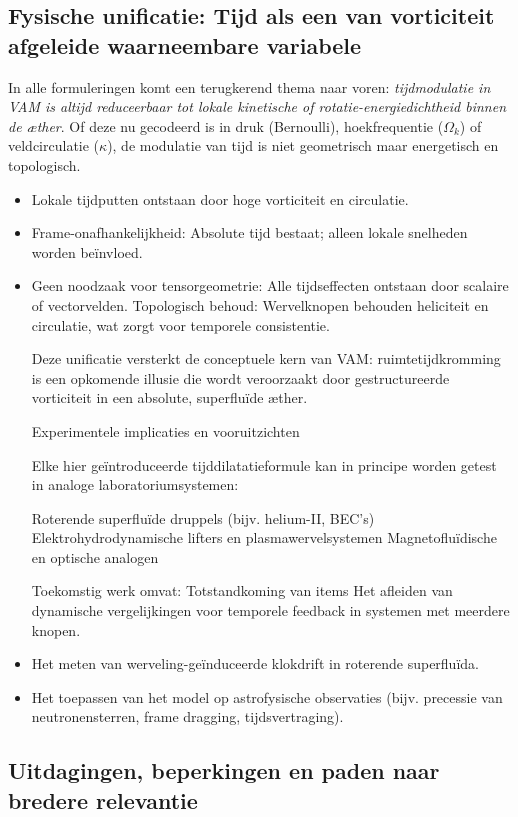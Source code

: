 \subsection{Fysische unificatie: Tijd als een van vorticiteit afgeleide waarneembare variabele}

In alle formuleringen komt een terugkerend thema naar voren: \textit{tijdmodulatie in VAM is altijd reduceerbaar tot lokale kinetische of rotatie-energiedichtheid binnen de æther}. Of deze nu gecodeerd is in druk (Bernoulli), hoekfrequentie (\( \Omega_k \)) of veldcirculatie (\( \kappa \)), de modulatie van tijd is niet geometrisch maar energetisch en topologisch.

\begin{itemize}
\item Lokale tijdputten ontstaan door hoge vorticiteit en circulatie.
\item Frame-onafhankelijkheid: Absolute tijd bestaat; alleen lokale snelheden worden beïnvloed.
\item Geen noodzaak voor tensorgeometrie: Alle tijdseffecten ontstaan door scalaire of vectorvelden.
Topologisch behoud: Wervelknopen behouden heliciteit en circulatie, wat zorgt voor temporele consistentie.

Deze unificatie versterkt de conceptuele kern van VAM: ruimtetijdkromming is een opkomende illusie die wordt veroorzaakt door gestructureerde vorticiteit in een absolute, superfluïde æther.

Experimentele implicaties en vooruitzichten

Elke hier geïntroduceerde tijddilatatieformule kan in principe worden getest in analoge laboratoriumsystemen:

Roterende superfluïde druppels (bijv. helium-II, BEC's)
Elektrohydrodynamische lifters en plasmawervelsystemen
Magnetofluïdische en optische analogen

Toekomstig werk omvat:
Totstandkoming van items
Het afleiden van dynamische vergelijkingen voor temporele feedback in systemen met meerdere knopen. \item Het meten van werveling-geïnduceerde klokdrift in roterende superfluïda.
\item Het toepassen van het model op astrofysische observaties (bijv. precessie van neutronensterren, frame dragging, tijdsvertraging).
\end{itemize}

\subsection{Uitdagingen, beperkingen en paden naar bredere relevantie}


